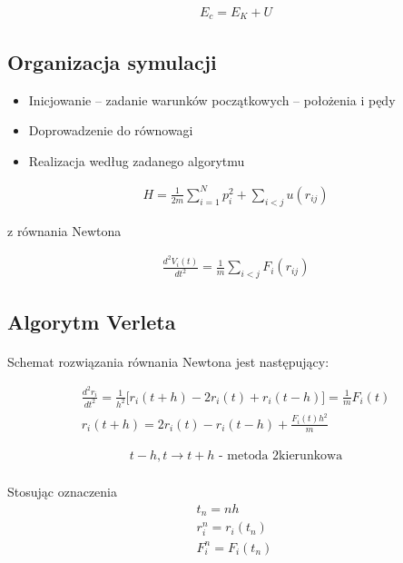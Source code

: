 \documentclass[a4paper,10pt]{article}
\begin{document}
\begin{gather*}
 E_c = E_K + U
\end{gather*}

\subsection{Organizacja symulacji}
\begin{itemize}
 \item Inicjowanie – zadanie warunków początkowych – położenia i pędy
 \item Doprowadzenie do równowagi
 \item Realizacja według zadanego algorytmu
\end{itemize}

\begin{gather*}
 H = \frac{1}{2m} \sum_{i = 1}^{N} p_i^2 + \sum_{i < j} u(r_{ij})
\end{gather*}

z równania Newtona

\begin{gather*}
 \frac{d^2 V_i(t)}{dt^2} = \frac{1}{m}\sum_{i<j}F_i(r_{ij})
\end{gather*}

\subsection{Algorytm Verleta}
\paragraph{} Schemat rozwiązania równania Newtona jest następujący:

\begin{gather}
 \frac{d^2r_i}{dt^2} = \frac{1}{h^2} \Big[ r_i(t+h) - 2r_i(t) + r_i(t-h)\Big] = \frac{1}{m}F_i(t) \\ 
 r_i(t+h) = 2r_i (t) - r_i(t-h) + \frac{F_i(t)h^2}{m}
\end{gather}

\begin{gather*}
 t - h, t \to t + h \text{ - metoda 2kierunkowa}
\end{gather*}

\paragraph{} Stosując oznaczenia
\begin{gather*}
 t_n = nh \\
 r_i^n = r_i(t_n) \\
 F_i^n = F_i (t_n) \
\end{gather*}
\end{document}
